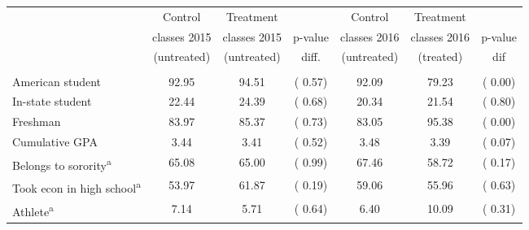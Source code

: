 \begin{tabular}{lcccccc} \toprule \toprule
& Control & Treatment & & Control & Treatment & \\
& classes 2015 & classes 2015& p-value & classes 2016 & classes 2016 & p-value \\
& (untreated) & (untreated) & diff. & (untreated) & (treated) & dif\\
\midrule \\
American student& 92.95& 94.51&(  0.57)& 92.09& 79.23&(  0.00) \\
In-state student& 22.44& 24.39&(  0.68)& 20.34& 21.54&(  0.80) \\
Freshman& 83.97& 85.37&(  0.73)& 83.05& 95.38&(  0.00) \\
Cumulative GPA &  3.44&  3.41&(  0.52)&  3.48&  3.39&(  0.07) \\
Belongs to sorority\textsuperscript{a} &  65.08& 65.00&(  0.99)& 67.46& 58.72&(  0.17) \\
Took econ in high school\textsuperscript{a} &  53.97& 61.87&(  0.19)& 59.06& 55.96&(  0.63) \\
Athlete\textsuperscript{a} &   7.14&  5.71&(  0.64)&  6.40& 10.09&(  0.31) \\
\bottomrule \bottomrule
\end{tabular}
